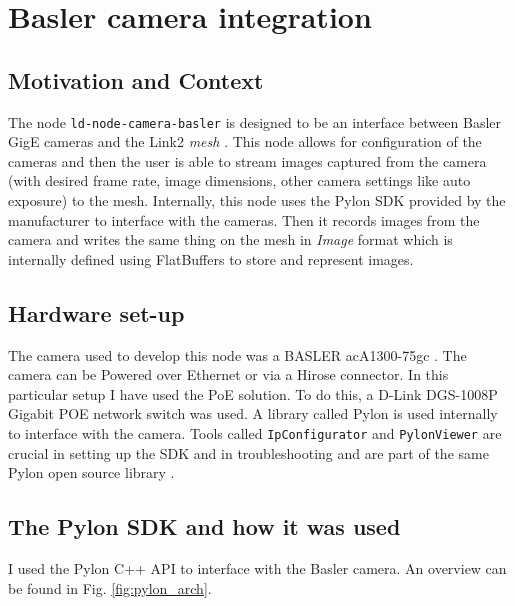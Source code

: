 \documentclass[a4paper, 12pt, oneside]{report}
\begin{document}
  
  \section{Basler camera integration}
  
  \subsection{Motivation and Context}
  The node \texttt{ld-node-camera-basler} \cite{NumericalAdvantageldnodecamerabaslerALink2nodetointerfaceaBasleraceseriesmachinevisioncamera-2020-02-20} is designed to be an interface between Basler GigE cameras \cite{BasleraceacA130075gcAreaScanCamera-2020-02-12} and the Link2 \textit{mesh} \cite{CorecomponentsDRAIVELinkDocumentation-2019-12-09}. This node allows for configuration of the cameras and then the user is able to stream images captured from the camera (with desired frame rate, image dimensions, other camera settings like auto exposure) to the mesh.
  Internally, this node uses the Pylon SDK provided by the manufacturer to interface with the cameras. Then it records images from the camera and writes the same thing on the mesh in \textit{Image} \cite{045ImageLinkDevelopersRFC-2020-01-16} format which is internally defined using FlatBuffers \cite{FlatBuffersFlatBuffers-2019-06-20} to store and represent images.
  
  \subsection{Hardware set-up}
  
  The camera used to develop this node was a BASLER acA1300-75gc \cite{BasleraceacA130075gcAreaScanCamera-2020-02-12}. The camera can be Powered over Ethernet or via a Hirose connector. In this particular setup I have used the PoE solution. To do this, a D-Link DGS-1008P Gigabit POE network switch \cite{DLinkDGS1008P8PortGigabitEthernetPoESwitchDLinkWorkscom-2020-02-17} was used. A library called Pylon \cite{pylonOpenSource-2020-02-14} is used internally to interface with the camera.
  Tools called \texttt{IpConfigurator} and \texttt{PylonViewer} are crucial in setting up the SDK and in troubleshooting and are part of the same Pylon open source library \cite{pylonOpenSource-2020-02-14}. 
  
  \subsection{The Pylon SDK and how it was used}
  I used the Pylon C++ API to interface with the Basler camera. An overview can be found in Fig. \ref{fig:pylon_arch}.
  
\end{document}
